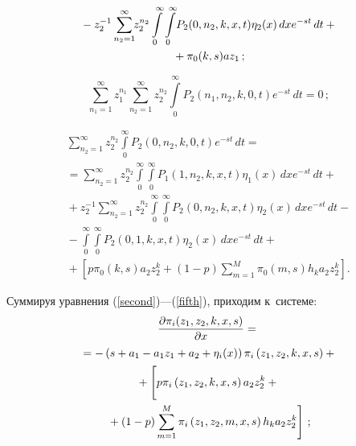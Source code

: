 \begin{multicols}{2}
\noindent
\begin{multline}
{}-z_2^{-1}\sum\limits_{n_2=1}^{\infty}\hspace*{-3pt}z_2^{n_2}
\int\limits_0^{\infty}\int\limits_0^{\infty}\!P_2(0,n_2,k,x,t)\eta_2(x)\,dx e^{-st}\,dt+{}\\
{}+
\pi_0(k,s)az_1\,;
\label{third}
\end{multline}

\vspace*{-9pt}

\noindent
\begin{equation}
\sum\limits_{n_1=1}^{\infty}z_1^{n_1}
\sum\limits_{n_2=1}^{\infty}z_2^{n_2}\int\limits_0^{\infty}
P_2\left(n_1,n_2,k,0,t\right)e^{-st}\,dt=0\,;
\label{fourth}
\end{equation}

\vspace*{-12pt}

\noindent
\begin{multline}
\sum\limits_{n_2=1}^{\infty}z_2^{n_2}
\int\limits_0^{\infty}P_2\left(0,n_2,k,0,t\right)e^{-st}\,dt={}\\
{}=
\sum\limits_{n_2=1}^{\infty}z_2^{n_2}\int\limits_0^{\infty}
\int\limits_0^{\infty}P_1(1,n_2,k,x,t)\eta_1(x)\,dxe^{-st}\,dt+{}\\
{}+z_2^{-1}\sum\limits_{n_2=1}^{\infty}z_2^{n_2}
\int\limits_0^{\infty}\int\limits_0^{\infty}P_2(0,n_2,k,x,t)\eta_2(x)\,dxe^{-st}\,dt-{}\\
{}-
\int\limits_0^{\infty}\int\limits_0^{\infty}P_2(0,1,k,x,t)\eta_2(x)\,dxe^{-st}\,dt+{}\\
\!\!\!{}+\left[p\pi_0(k,s)a_2 z_2^{k}+(1-p)\!
\sum\limits_{m=1}^M\!\pi_0(m,s)h_k a_2 z_2^k\right].\!\!\!
\label{fifth}
\end{multline}

Суммируя уравнения (\ref{second})---(\ref{fifth}), приходим к~сис\-те\-ме:
\begin{multline}
\fr{\partial \pi_i(z_1,z_2,k,x,s)}{\partial x}
={}\\
{}= -\left(s+a_1-a_1 z_1+a_2+\eta_i(x)\right)\pi_i\left(z_1,z_2,k,x,s\right)+{}\\
{}+\left[
\vphantom{\sum\limits_{m=1}^{M}}
p\pi_i\left(z_1,z_2,k,x,s\right)a_2 z_2^k+{}\right.\\
\left.{}+(1-p)\sum\limits_{m=1}^{M}
\pi_i\left(z_1,z_2,m,x,s\right)h_k a_2 z_2^k\right]\,;
\label{newfirst}
\end{multline}

\vspace*{-12pt}


\end{multicols}
